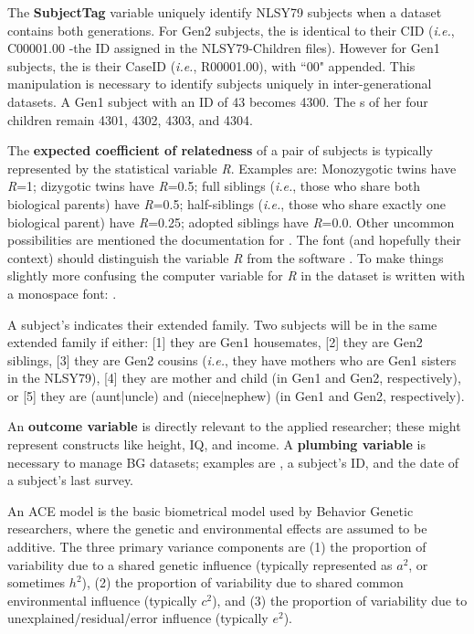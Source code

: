 \documentclass{article}\usepackage[]{graphicx}\usepackage[]{color}
\begin{document}
The \textbf{SubjectTag}\label{term:SubjectTag} variable uniquely identify NLSY79 subjects when a dataset contains both generations.  For Gen2 subjects, the  is identical to their CID (\emph{i.e.}, C00001.00 -the ID assigned in the NLSY79-Children files).  However for Gen1 subjects, the  is their CaseID (\emph{i.e.}, R00001.00), with ``00" appended.  This manipulation is necessary to identify subjects uniquely in inter-generational datasets.  A Gen1 subject with an ID of 43 becomes 4300.  The s of her four children remain 4301, 4302, 4303, and 4304.

The \textbf{expected coefficient of relatedness} of a pair of subjects is typically represented by the statistical variable \emph{R}.  Examples are: Monozygotic twins have \emph{R}=1; dizygotic twins have \emph{R}=0.5; full siblings (\emph{i.e.}, those who share both biological parents) have \emph{R}=0.5;  half-siblings (\emph{i.e.}, those who share exactly one biological parent) have \emph{R}=0.25; adopted siblings have \emph{R}=0.0.  Other uncommon possibilities are mentioned the documentation for .  The font (and hopefully their context) should distinguish the variable \emph{R} from the software \R{}. To make things slightly more confusing the computer variable for \emph{R} in the  dataset is written with a monospace font: .

A subject's  indicates their extended family.  Two subjects will be in the same extended family if either: [1] they are Gen1 housemates, [2] they are Gen2 siblings, [3] they are Gen2 cousins (\emph{i.e.}, they have mothers who are Gen1 sisters in the NLSY79), [4] they are mother and child (in Gen1 and Gen2, respectively), or [5] they are (aunt|uncle) and (niece|nephew) (in Gen1 and Gen2, respectively).

An \textbf{outcome variable} is directly relevant to the applied researcher; these might represent constructs like height, IQ, and income.  A \textbf{plumbing variable} is necessary to manage BG datasets; examples are , a subject's ID, and the date of a subject's last survey.

An ACE model is the basic biometrical model used by Behavior Genetic researchers, where the genetic and environmental effects are assumed to be additive. The three primary variance components are (1) the proportion of variability due to a shared genetic influence (typically represented as $a^2$, or sometimes $h^2$), (2) the proportion of variability due to shared common environmental influence (typically $c^2$), and (3) the proportion of variability due to unexplained/residual/error influence (typically $e^2$).  
\end{document}
